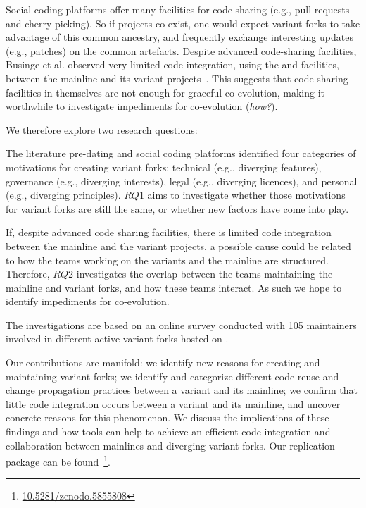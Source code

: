 Social coding platforms offer many facilities for code sharing (e.g., pull requests and cherry-picking).
So if projects co-exist, one would expect variant forks to take advantage of this common ancestry, and frequently exchange interesting updates (e.g., patches) on the common artefacts.
Despite advanced code-sharing facilities, Businge et al. observed very limited code integration, using the \git and \gh facilities, between the mainline and its variant projects~\cite{businge:emse:2021}.
This suggests that code sharing facilities in themselves are not enough for graceful co-evolution, making it worthwhile to investigate impediments for co-evolution (\textit{how?}).

\noindent
We therefore explore two research questions:

\textit{\textbf{\RQOne}}
The literature pre-dating \git and social coding platforms identified four categories of motivations for creating variant forks: technical (e.g., diverging features), governance (e.g., diverging interests), legal (e.g., diverging licences), and personal (e.g., diverging principles).
$RQ1$ aims to investigate whether those motivations for variant forks are still the same, or whether new factors have come into play. 

\textit{\textbf{\RQTwo}}
If, despite advanced code sharing facilities, there is limited code integration between the mainline and the variant projects, a possible cause could be related to how the teams working on the variants and the mainline are structured.
Therefore, $RQ2$ investigates the overlap between the teams maintaining the mainline and variant forks, and how these teams interact.
As such we hope to identify impediments for co-evolution.


The investigations are based on an online survey conducted with 105 maintainers involved in different active variant forks hosted on \gh.

Our contributions are manifold:
we identify new reasons for creating and maintaining variant forks;
we identify and categorize different code reuse and change propagation practices between a variant and its mainline;
we confirm that little code integration occurs between a variant and its mainline, and uncover concrete reasons for this phenomenon.
We discuss the implications of these findings and how tools can help to achieve an efficient code integration and collaboration between mainlines and diverging variant forks.
Our replication package can be found~\footnote{\url{10.5281/zenodo.5855808}}.


